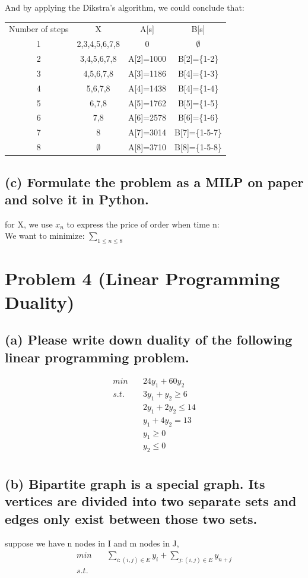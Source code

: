 \documentclass[a4paper,12pt]{journal}
\begin{document}
	And by applying the Dikstra's algorithm, we could conclude that:
	\begin{center}
		\begin{tabular}{c c c c}
			Number of steps&X&A[s]&B[s]\\
			1&2,3,4,5,6,7,8&0&$\emptyset$\\
			2&3,4,5,6,7,8&A[2]=1000&B[2]=\{1-2\}\\
			3&4,5,6,7,8&A[3]=1186&B[4]=\{1-3\}\\
			4&5,6,7,8&A[4]=1438&B[4]=\{1-4\}\\
			5&6,7,8&A[5]=1762&B[5]=\{1-5\}\\
			6&7,8&A[6]=2578&B[6]=\{1-6\}\\
			7&8&A[7]=3014&B[7]=\{1-5-7\}\\
			8&$\emptyset$&A[8]=3710&B[8]=\{1-5-8\}\\
		\end{tabular}
	\end{center}
	\subsection*{(c) Formulate the problem as a MILP on paper and solve it in Python.}
	for X, we use $x_n$ to express the price of order when time n:\\
	We want to minimize: $\sum_{1\leq n\leq 8}$\\
	
	\section*{Problem 4 (Linear Programming Duality)}
	\subsection*{(a) Please write down duality of the following linear programming problem.}
	\begin{equation}
		\begin{aligned}
			min\quad&24y_1+60y_2\\
			s.t.\quad&3y_1+y_2\geq 6\\
			&2y_1+2y_2\leq 14\\
			&y_1+4y_2= 13\\
			&y_1\geq 0\\
			&y_2\leq 0\\
		\end{aligned}
	\end{equation}
	\subsection*{(b) Bipartite graph is a special graph. Its vertices are divided into two separate sets and edges only exist between those two sets.}
	suppose we have n nodes in I and m nodes in J, 
	\begin{equation}
		\begin{aligned}
			min\quad &\sum_{i:(i,j)\in E}y_i+\sum_{j:(i,j)\in E}y_{n+j}\\
			s.t.\quad &
		\end{aligned}
	\end{equation}
\end{document}
